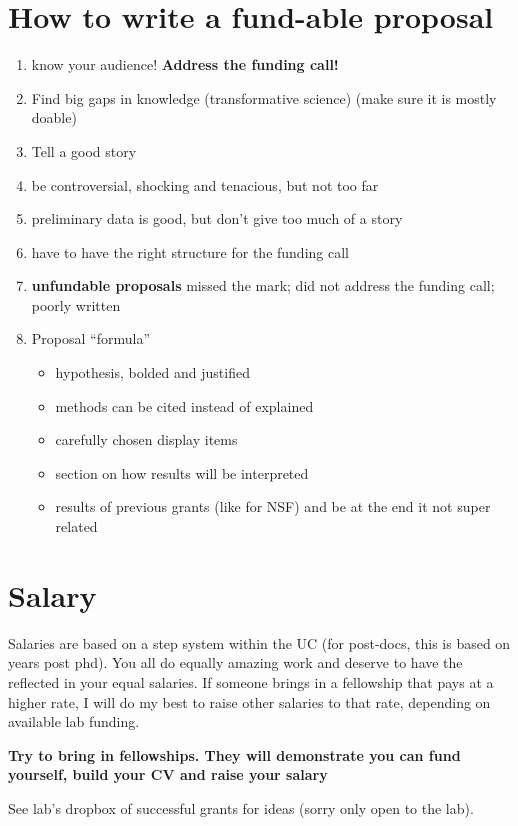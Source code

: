 \documentclass[12pt]{article}
\begin{document}
\section{How to write a fund-able proposal}

\begin{enumerate}
\item know your audience! \textbf{Address the funding call!}
\item Find big gaps in knowledge (transformative science) (make sure
  it is mostly doable)
\item Tell a good story
\item be controversial, shocking and tenacious, but not too far
\item preliminary data is good, but don't give too much of a story
\item have to have the right structure for the funding call
\item \textbf{unfundable proposals} missed the mark; did not address
  the funding call; poorly written
\item Proposal ``formula''
  \begin{itemize}
  \item hypothesis, bolded and justified
  \item methods can be cited instead of explained
  \item carefully chosen display items
  \item section on how results will be interpreted
  \item results of previous grants (like for NSF) and be at the end it
    not super related
  \end{itemize}
\end{enumerate}

\section{Salary}
Salaries are based on a step system within the UC (for post-docs, this
is based on years post phd). You all do equally amazing work and
deserve to have the reflected in your equal salaries. If someone
brings in a fellowship that pays at a higher rate, I will do my best
to raise other salaries to that rate, depending on available lab
funding.

\textbf{Try to bring in fellowships. They will demonstrate you can
  fund yourself, build your CV and raise your salary}

See lab's dropbox of successful grants for ideas (sorry only open to
the lab).
\end{document}
